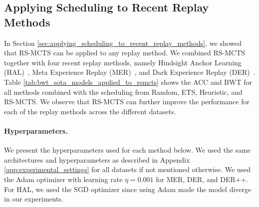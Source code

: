 \subsection{Applying Scheduling to Recent Replay Methods}
\label{app:apply_scheduling_to_recent_replay_methods}

In Section \ref{sec:applying_scheduling_to_recent_replay_methods}, we showed that RS-MCTS can be applied to any replay method. We combined RS-MCTS together with four recent replay methods, namely Hindsight Anchor Learning (HAL)~\citep{chaudhry2021using}, Meta Experience Replay (MER)~\citep{riemer2018learning}, and Dark Experience Replay (DER)~\citep{buzzega2020dark}. Table \ref{tab:bwt_sota_models_applied_to_rsmcts} shows the ACC and BWT for all methods combined with the scheduling from Random, ETS, Heuristic, and RS-MCTS. We observe that RS-MCTS can further improve the performance for each of the replay methods across the different datasets.  

\paragraph{Hyperparameters.} We present the hyperparameters used for each method below. We used the same architectures and hyperparameters as described in Appendix \ref{app:experimental_settings} for all datasets if not mentioned otherwise. We used the Adam optimizer with learning rate $\eta=0.001$ for MER, DER, and DER++. For HAL, we used the SGD optimizer since using Adam made the model diverge in our experiments.  

